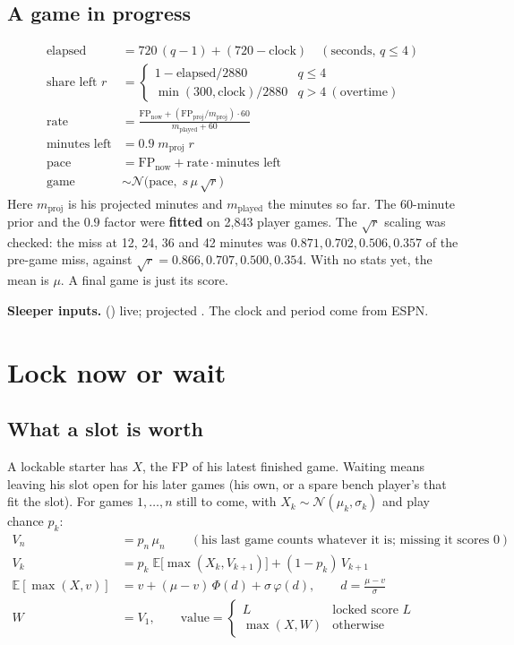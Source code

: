 \documentclass[10pt]{article}
\newcommand{\api}[1]{\texttt{\detokenize{#1}}}
\newcommand{\E}{\mathbb{E}}
\newcommand{\sleeper}[1]{\par\textbf{Sleeper inputs.} #1}
\begin{document}
\subsection{A game in progress}
\begin{align}
\text{elapsed} &= 720\,(q-1) + (720 - \text{clock}) \quad(\text{seconds, } q\le 4)\\
\text{share left } r &= \begin{cases}1-\text{elapsed}/2880 & q\le 4\\ \min(300,\text{clock})/2880 & q>4\ (\text{overtime})\end{cases}\\
\text{rate} &= \frac{\mathrm{FP}_{\text{now}} + (\mathrm{FP}_{\text{proj}}/m_{\text{proj}})\cdot 60}{m_{\text{played}} + 60}\\
\text{minutes left} &= 0.9\; m_{\text{proj}}\; r\\
\text{pace} &= \mathrm{FP}_{\text{now}} + \text{rate}\cdot\text{minutes left}\\
\text{game} &\sim \mathcal N\big(\text{pace},\; s\,\mu\,\sqrt{r}\big)
\end{align}
Here $m_{\text{proj}}$ is his projected minutes and $m_{\text{played}}$ the minutes so far. The $60$-minute prior and the
$0.9$ factor were \textbf{fitted} on 2{,}843 player games. The $\sqrt r$ scaling was checked: the miss at 12, 24, 36
and 42 minutes was $0.871, 0.702, 0.506, 0.357$ of the pre-game miss, against $\sqrt r = 0.866, 0.707, 0.500, 0.354$.
With no stats yet, the mean is $\mu$. A final game is just its score.
\sleeper{\api{stats} (\api{pts ... sp}) live; projected \api{sp}. The clock and period come from ESPN.}

\section{Lock now or wait}
\subsection{What a slot is worth}
A lockable starter has $X$, the FP of his latest finished game. Waiting means leaving his slot open for his later
games (his own, or a spare bench player's that fit the slot). For games $1,\dots,n$ still to come, with
$X_k\sim\mathcal N(\mu_k,\sigma_k)$ and play chance $p_k$:
\begin{align}
V_n &= p_n\,\mu_n \qquad(\text{his last game counts whatever it is; missing it scores } 0)\\
V_k &= p_k\;\E\big[\max(X_k, V_{k+1})\big] + (1-p_k)\,V_{k+1}\\
\E[\max(X,v)] &= v + (\mu-v)\,\Phi(d) + \sigma\,\varphi(d),\qquad d=\frac{\mu-v}{\sigma}\\
W &= V_1,\qquad \text{value}=\begin{cases}L & \text{locked score } L\\ \max(X,W)&\text{otherwise}\end{cases}
\end{align}
\end{document}
